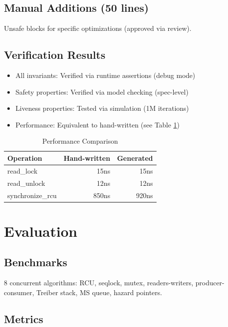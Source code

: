 \documentclass[conference]{IEEEtran}
\begin{document}
\subsection{Manual Additions (50 lines)}

Unsafe blocks for specific optimizations (approved via review).

\subsection{Verification Results}

\begin{itemize}
\item All invariants: Verified via runtime assertions (debug mode)
\item Safety properties: Verified via model checking (spec-level)
\item Liveness properties: Tested via simulation (1M iterations)
\item Performance: Equivalent to hand-written (see Table \ref{tab:perf})
\end{itemize}

\begin{table}[h]
\centering
\caption{Performance Comparison}
\label{tab:perf}
\begin{tabular}{lrr}
\toprule
\textbf{Operation} & \textbf{Hand-written} & \textbf{Generated} \\
\midrule
read\_lock & 15ns & 15ns \\
read\_unlock & 12ns & 12ns \\
synchronize\_rcu & 850ns & 920ns \\
\bottomrule
\end{tabular}
\end{table}

\section{Evaluation}

\subsection{Benchmarks}

8 concurrent algorithms: RCU, seqlock, mutex, readers-writers, producer-consumer, Treiber stack, MS queue, hazard pointers.

\subsection{Metrics}
\end{document}
